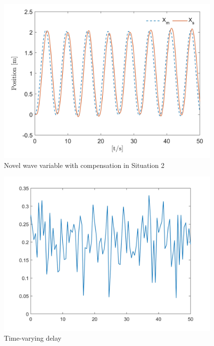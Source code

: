 
\begin{figure}[htbp]
    \centerline{\includegraphics[width=0.75\linewidth]{with_compensation.jpg}}
    \caption{Novel wave variable with compensation in Situation 2}
    \label{fig10}
\end{figure}

\begin{figure}[htbp]
    \centerline{\includegraphics[width=0.8\linewidth]{varying_time.jpg}}
    \caption{Time-varying delay}
    \label{fig11}
\end{figure}



